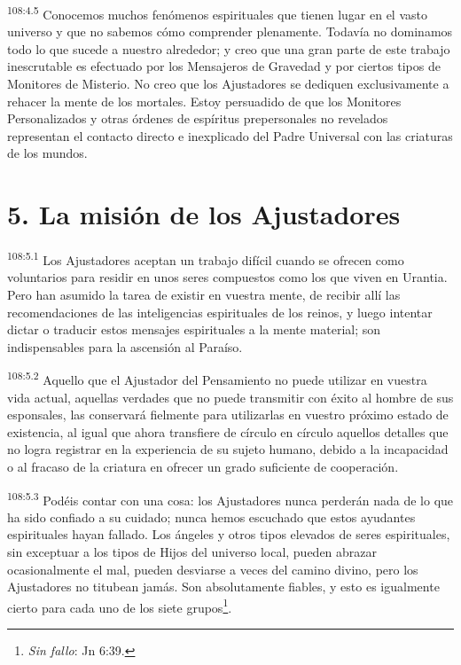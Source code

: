 \par
\textsuperscript{108:4.5} Conocemos muchos fenómenos espirituales que tienen lugar en el vasto universo y que no sabemos cómo comprender plenamente. Todavía no dominamos todo lo que sucede a nuestro alrededor; y creo que una gran parte de este trabajo inescrutable es efectuado por los Mensajeros de Gravedad y por ciertos tipos de Monitores de Misterio. No creo que los Ajustadores se dediquen exclusivamente a rehacer la mente de los mortales. Estoy persuadido de que los Monitores Personalizados y otras órdenes de espíritus prepersonales no revelados representan el contacto directo e inexplicado del Padre Universal con las criaturas de los mundos.

\section*{5. La misión de los Ajustadores}
\par
\textsuperscript{108:5.1} Los Ajustadores aceptan un trabajo difícil cuando se ofrecen como voluntarios para residir en unos seres compuestos como los que viven en Urantia. Pero han asumido la tarea de existir en vuestra mente, de recibir allí las recomendaciones de las inteligencias espirituales de los reinos, y luego intentar dictar o traducir estos mensajes espirituales a la mente material; son indispensables para la ascensión al Paraíso.

\par
\textsuperscript{108:5.2} Aquello que el Ajustador del Pensamiento no puede utilizar en vuestra vida actual, aquellas verdades que no puede transmitir con éxito al hombre de sus esponsales, las conservará fielmente para utilizarlas en vuestro próximo estado de existencia, al igual que ahora transfiere de círculo en círculo aquellos detalles que no logra registrar en la experiencia de su sujeto humano, debido a la incapacidad o al fracaso de la criatura en ofrecer un grado suficiente de cooperación.

\par
\textsuperscript{108:5.3} Podéis contar con una cosa: los Ajustadores nunca perderán nada de lo que ha sido confiado a su cuidado; nunca hemos escuchado que estos ayudantes espirituales hayan fallado. Los ángeles y otros tipos elevados de seres espirituales, sin exceptuar a los tipos de Hijos del universo local, pueden abrazar ocasionalmente el mal, pueden desviarse a veces del camino divino, pero los Ajustadores no titubean jamás. Son absolutamente fiables, y esto es igualmente cierto para cada uno de los siete grupos\footnote{\textit{Sin fallo}: Jn 6:39.}.

